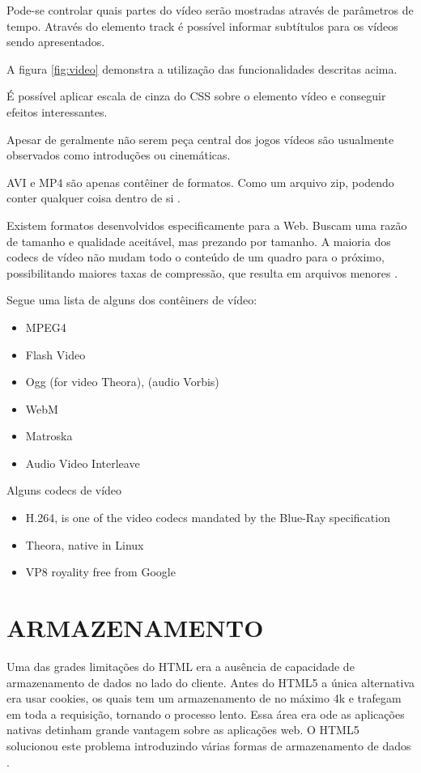 \begin{draft}

Pode-se controlar quais partes do vídeo serão mostradas através de parâmetros de tempo.
Através do elemento track é possível informar subtítulos para os vídeos sendo apresentados.

A figura \ref{fig:video} demonstra a utilização das funcionalidades descritas acima.

É possível aplicar escala de cinza do CSS sobre o elemento vídeo e conseguir efeitos interessantes.

Apesar de geralmente não serem peça central dos jogos vídeos são
usualmente observados como introduções ou cinemáticas.

AVI e MP4 são apenas contêiner de formatos. Como um arquivo zip,
podendo conter qualquer coisa dentro de si \autocite{diveIntohtml}.

Existem formatos desenvolvidos especificamente para a Web. Buscam uma
razão de tamanho e qualidade aceitável, mas prezando por tamanho. A
maioria dos codecs de vídeo não mudam todo o conteúdo de um quadro
para o próximo, possibilitando maiores taxas de compressão, que
resulta em arquivos menores \autocite{diveIntohtml}.

Segue uma lista de alguns dos contêiners de vídeo:
\begin{itemize}
    \item{MPEG4}
    \item{Flash Video}
    \item{Ogg} (for video Theora), (audio Vorbis)
    \item{WebM}
    \item{Matroska}
    \item{Audio Video Interleave}
\end{itemize}

Alguns codecs de vídeo

\begin{itemize}
    \item{H.264, is one of the video codecs mandated by the Blue-Ray specification}
    \item{Theora, native in Linux}
    \item{VP8 royality free from Google}
\end{itemize}

\end{draft}
\section{ARMAZENAMENTO}
Uma das grades limitações do HTML era a ausência de capacidade de
armazenamento de dados no lado do cliente. Antes do HTML5 a única
alternativa era usar cookies, os quais tem um armazenamento de no
máximo 4k e trafegam em toda a requisição, tornando o processo lento.
Essa área era ode as aplicações nativas detinham grande vantagem
sobre as aplicações web. O HTML5 solucionou este problema introduzindo
várias formas de armazenamento de dados \autocite{html5Tradeoffs}.

